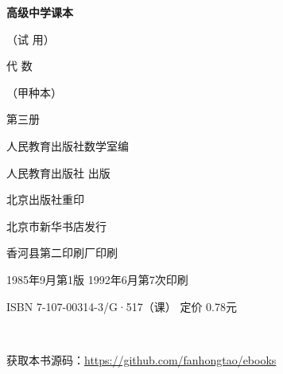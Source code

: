 \begin{titlepage}
    \begin{center}
        \vspace*{3cm}

        {\Large \textbf{高级中学课本} }

        {\Large（试 用）}

        \vspace{1cm}

        {\Huge 代 \qquad 数}

        \vspace{0.5cm}

        {\Large （甲种本）}

        {\Large 第三册}

        \vspace{1cm}
        {\Large 人民教育出版社数学室编}

        \vfill


        人民教育出版社 出版

        北京出版社重印

        北京市新华书店发行

        香河县第二印刷厂印刷

        1985年9月第1版  \qquad 1992年6月第7次印刷

        ISBN 7-107-00314-3/G·517（课） \quad 定价 0.78元

        \,

        获取本书源码：\url{https://github.com/fanhongtao/ebooks}
    \end{center}
 \end{titlepage}
